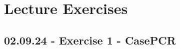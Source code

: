 \chapter{Lecture Exercises}
\setlength{\headheight}{22.94003pt}
\addtolength{\topmargin}{-10.22661pt}

\section{02.09.24 - Exercise 1 - CasePCR}
